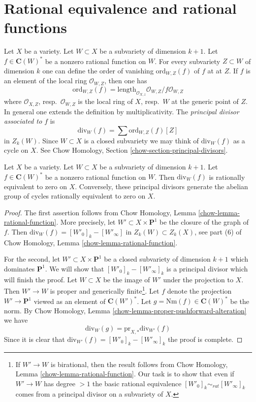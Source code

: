 \section{Rational equivalence and rational functions}
\label{section-alternative}

\noindent
Let $X$ be a variety. Let $W \subset X$ be a subvariety
of dimension $k + 1$. Let $f \in \mathbf{C}(W)^*$ be a nonzero rational
function on $W$. For every subvariety $Z \subset W$ of dimension $k$
one can define the order of vanishing $\text{ord}_{W, Z}(f)$ of $f$ at
at $Z$. If $f$ is an element of the local ring $\mathcal{O}_{W, Z}$,
then one has
$$
\text{ord}_{W, Z}(f) =
\text{length}_{\mathcal{O}_{X, z}} \mathcal{O}_{W, Z}/f\mathcal{O}_{W, Z}
$$
where $\mathcal{O}_{X, Z}$, resp.\ $\mathcal{O}_{W, Z}$ is the
local ring of $X$, resp.\ $W$ at the generic point of $Z$. In general one
extends the definition by multiplicativity. The {\it principal divisor
associated to $f$} is
$$
\text{div}_W(f) = \sum \text{ord}_{W, Z}(f)[Z]
$$
in $Z_k(W)$. Since $W \subset X$ is a closed subvariety we may think
of $\text{div}_W(f)$ as a cycle on $X$.
See Chow Homology, Section \ref{chow-section-principal-divisors}.

\begin{lemma}
\label{lemma-rational-equivalence}
Let $X$ be a variety. Let $W \subset X$ be a subvariety
of dimension $k + 1$. Let $f \in \mathbf{C}(W)^*$ be a nonzero rational
function on $W$. Then $\text{div}_W(f)$ is rationally equivalent to zero on
$X$. Conversely, these principal divisors generate the abelian group of
cycles rationally equivalent to zero on $X$.
\end{lemma}

\begin{proof}
The first assertion follows from
Chow Homology, Lemma \ref{chow-lemma-rational-function}.
More precisely, let $W' \subset X \times \mathbf{P}^1$ be the closure
of the graph of $f$. Then $\text{div}_W(f) = [W'_0]_k - [W'_\infty]$
in $Z_k(W) \subset Z_k(X)$, see part (6) of
Chow Homology, Lemma \ref{chow-lemma-rational-function}.

\medskip\noindent
For the second, let $W' \subset X \times \mathbf{P}^1$ be a closed
subvariety of dimension $k + 1$ which dominates $\mathbf{P}^1$.
We will show that $[W'_0]_k - [W'_\infty]_k$ is a principal divisor
which will finish the proof. Let $W \subset X$ be the image of $W'$
under the projection to $X$. Then $W' \to W$ is proper and generically
finite\footnote{If $W' \to W$ is birational, then the result follows
from Chow Homology, Lemma \ref{chow-lemma-rational-function}.
Our task is to show that even if $W' \to W$
has degree $>1$ the basic rational equivalence
$[W'_0]_k \sim_{rat} [W'_\infty]_k$ comes from a principal divisor
on a subvariety of $X$.}. Let $f$ denote the projection $W' \to \mathbf{P}^1$
viewed as an element of $\mathbf{C}(W')^*$. Let
$g = \text{Nm}(f) \in \mathbf{C}(W)^*$ be the norm. By
Chow Homology, Lemma \ref{chow-lemma-proper-pushforward-alteration}
we have
$$
\text{div}_W(g) = \text{pr}_{X, *}\text{div}_{W'}(f)
$$
Since it is clear that 
$\text{div}_{W'}(f) = [W'_0]_k - [W'_\infty]_k$ the proof is complete.
\end{proof}


